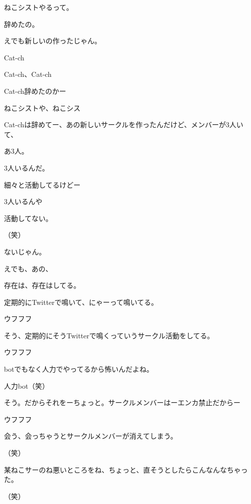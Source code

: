 \begin{multicols}{3}
{        ねこシストやるって。

        辞めたの。

        えでも新しいの作ったじゃん。

        Cat-ch

        Cat-ch、Cat-ch

        Cat-ch辞めたのかー

        ねこシストや、ねこシス

        Cat-chは辞めてー、あの新しいサークルを作ったんだけど、メンバーが3人いて、

        あ3人。

        3人いるんだ。

        細々と活動してるけどー

        3人いるんや

        活動してない。

        （笑）

        ないじゃん。

        えでも、あの、

        存在は、存在はしてる。

        定期的にTwitterで鳴いて、にゃーって鳴いてる。

        ウフフフ

        そう、定期的にそうTwitterで鳴くっていうサークル活動をしてる。

        ウフフフ

        botでもなく人力でやってるから怖いんだよね。

        人力bot（笑）

        そう。だからそれをーちょっと。サークルメンバーはーエンカ禁止だからー

        ウフフフ

        会う、会っちゃうとサークルメンバーが消えてしまう。

        （笑）

        某ねこサーのね悪いところをね、ちょっと、直そうとしたらこんなんなちゃった。

        （笑）

}
\end{multicols}

